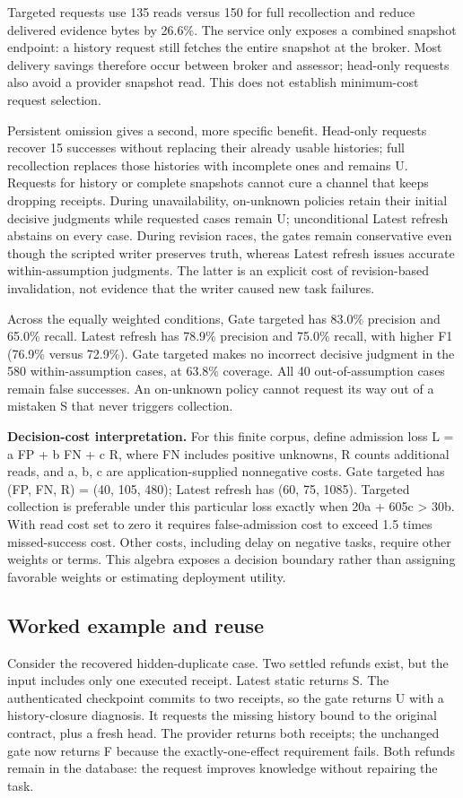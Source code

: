 \documentclass[11pt]{article}
\begin{document}
Targeted requests use 135 reads versus 150 for full recollection and reduce delivered evidence bytes by 26.6\%. The service only exposes a combined snapshot endpoint: a history request still fetches the entire snapshot at the broker. Most delivery savings therefore occur between broker and assessor; head-only requests also avoid a provider snapshot read. This does not establish minimum-cost request selection.

Persistent omission gives a second, more specific benefit. Head-only requests recover 15 successes without replacing their already usable histories; full recollection replaces those histories with incomplete ones and remains U. Requests for history or complete snapshots cannot cure a channel that keeps dropping receipts. During unavailability, on-unknown policies retain their initial decisive judgments while requested cases remain U; unconditional Latest refresh abstains on every case. During revision races, the gates remain conservative even though the scripted writer preserves truth, whereas Latest refresh issues accurate within-assumption judgments. The latter is an explicit cost of revision-based invalidation, not evidence that the writer caused new task failures.

Across the equally weighted conditions, Gate targeted has 83.0\% precision and 65.0\% recall. Latest refresh has 78.9\% precision and 75.0\% recall, with higher F1 (76.9\% versus 72.9\%). Gate targeted makes no incorrect decisive judgment in the 580 within-assumption cases, at 63.8\% coverage. All 40 out-of-assumption cases remain false successes. An on-unknown policy cannot request its way out of a mistaken S that never triggers collection.

\textbf{Decision-cost interpretation.} For this finite corpus, define admission loss L = a FP + b FN + c R, where FN includes positive unknowns, R counts additional reads, and a, b, c are application-supplied nonnegative costs. Gate targeted has (FP, FN, R) = (40, 105, 480); Latest refresh has (60, 75, 1085). Targeted collection is preferable under this particular loss exactly when 20a + 605c > 30b. With read cost set to zero it requires false-admission cost to exceed 1.5 times missed-success cost. Other costs, including delay on negative tasks, require other weights or terms. This algebra exposes a decision boundary rather than assigning favorable weights or estimating deployment utility.

\subsection{Worked example and reuse}
Consider the recovered hidden-duplicate case. Two settled refunds exist, but the input includes only one executed receipt. Latest static returns S. The authenticated checkpoint commits to two receipts, so the gate returns U with a history-closure diagnosis. It requests the missing history bound to the original contract, plus a fresh head. The provider returns both receipts; the unchanged gate now returns F because the exactly-one-effect requirement fails. Both refunds remain in the database: the request improves knowledge without repairing the task.
\end{document}
